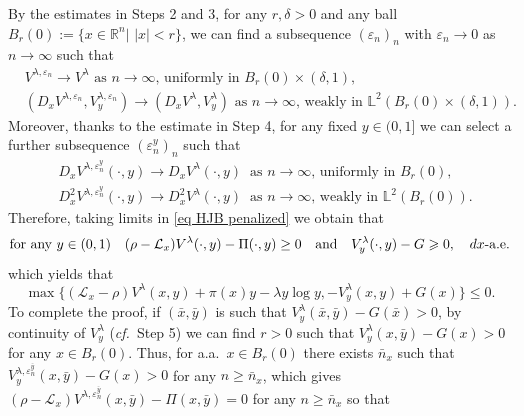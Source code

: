 \documentclass[11pt]{amsart}
\theoremstyle{plain}
\def \dd{{\rm d}}
\numberwithin{equation}{section}
\begin{document}
By the estimates in Steps 2 and 3, for any $r, \delta > 0$ and any ball $B_r (0) := \{ x \in \mathbb R ^n | \,\, |x|<r \}$, we can find a subsequence $(\varepsilon_n)_n$ with $\varepsilon_n \to 0$ as $n \to \infty$ such that
\begin{equation}
   \label{eq limits Vx Vy} 
   \begin{aligned}
   & V^{\lambda,\varepsilon_n} \to V^\lambda  \text{ as $n \to \infty$, uniformly in $B_r(0) \times (\delta, 1) $,} \\
   & (D_x V^{\lambda,\varepsilon_n},V^{\lambda,\varepsilon_n}_y) \to (D_x V^\lambda,V^\lambda_y)  \text{ as $n \to \infty$, weakly in $\mathbb L ^2 (B_r(0) \times (\delta, 1) )$.}
   \end{aligned}
\end{equation}
Moreover, thanks to the estimate in Step 4, for any fixed $y \in (0,1]$ we can select a further subsequence $(\varepsilon^y_n)_n$ such that
\begin{equation} \label{eq limits DV Delta V}
\begin{aligned}
    & D_x V^{\lambda,\varepsilon^y_n} (\cdot,y) \to D_x V^\lambda(\cdot,y) \ \text{ as $n \to \infty$, uniformly in $B_r(0)$,} \\
   & D_x^2 V^{\lambda,\varepsilon^y_n}(\cdot,y) \to D^2_xV^\lambda(\cdot,y) \ \text{ as $n \to \infty$, weakly in $\mathbb L ^2 (B_r(0))$.}
\end{aligned}    
\end{equation}
Therefore, taking limits in \eqref{eq HJB penalized} %
we obtain that
\begin{equation*}
\text{for any $y \in (0,1)$} \quad (\rho -\mathcal{L}_{x}) {V^\lambda} (\cdot,y)-\Pi(\cdot,y) \geq0 \quad \text{and} \quad V^\lambda_y(\cdot,y) -G \geqslant 0, \quad \text{$\dd x$-a.e.}
\end{equation*}
which yields that
\begin{equation}\label{eq HJB inequality}
    \max \big\{ \left(\mathcal{L}_{x} -\rho \right) V^\lambda(x, y) + \pi (x) y - \lambda y \log y, - V^\lambda_{y}(x, y) + G(x) \big\}\leq 0. 
\end{equation}
To complete the proof, if $(\bar x, \bar y)$ is such that $V^\lambda_y(\bar x,\bar y) -G (\bar x) > 0$, by continuity of $V^\lambda_y$ ({\it cf.}\ Step 5) we can find $r>0$ such that $V^\lambda_y ( x, \bar y) -G (x) > 0$ for any $x \in B_r(0) $. 
Thus, for a.a.\ $x \in B_r(0)$ there exists $\bar n_x$ such that ${V}^{\lambda,\varepsilon^{\bar y}_n}_y ( x, \bar y) -G (x) > 0$ for any $n \geq \bar n _x$, which gives $(\rho -\mathcal{L}_{x}) {V}^{\lambda,\varepsilon^{\bar y}_n} (x,\bar y)-\Pi(x,\bar y) = 0$ for any $n \geq \bar n _x$ so that
\end{document}
